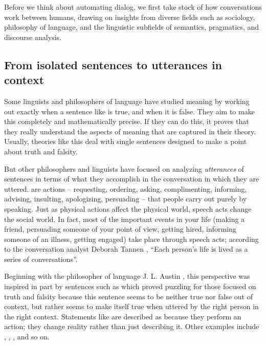 Before we think about automating dialog, we first take stock of how conversations work between humans,  drawing on insights from diverse fields such as sociology, philosophy of language, and the linguistic subfields of semantics, pragmatics, and discourse analysis.  


\subsection{From isolated sentences to utterances in context}

Some linguists and philosophers of language have studied meaning by working out exactly when a sentence like  is true, and when it is false. They aim to make this completely and mathematically precise. If they can do this, it proves that they really understand the aspects of meaning that are captured in their theory. Usually, theories like this deal with single sentences designed to make a point about truth and falsity.

But other philosophers and linguists have focused on analyzing \emph{utterances} of sentences in terms of what they accomplish in the conversation in which they are uttered.   are actions -- requesting, ordering, asking, complimenting, informing, advising, insulting, apologizing, persuading -- that people carry out purely by speaking. Just as physical actions affect the physical world, speech acts change the social world.  In fact, most of the important events in your life (making a friend, persuading someone of your point of view, getting hired, informing someone of an illness, getting engaged) take place through speech acts; according to the conversation analyst Deborah Tannen \citep{Tannen:1990}, ``Each person's life is lived as a series of conversations''.

Beginning with the philosopher of language J. L. Austin \citep{austin:75}, this perspective was inspired in part by sentences such as  which proved puzzling for those focused on  truth and falsity because this sentence seems to be neither true nor false out of context, but rather seems to make itself true when uttered by the right person in the right context.  Statements like  are described as  because they perform an action; they change reality rather than just describing it.  Other examples include , , , and so on.

